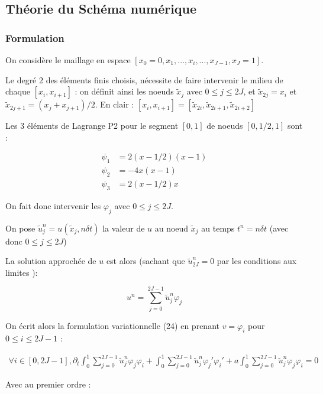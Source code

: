 \documentclass[french]{article}
\begin{document}
\subsection{Théorie du Schéma numérique}

\subsubsection{Formulation}

On considère le maillage en espace $ [x_{0}=0, x_{1},...,x_{i},...,x_{J-1},x_{J}=1] $.

Le degré 2 des éléments finis choisis, nécessite de faire intervenir le milieu de chaque $ [x_{i},x_{i+1}] $ : on définit ainsi les noeuds $ \tilde{x}_{j} $ avec $ 0 \leq j \leq 2J $, et $ \tilde{x}_{2j} = x_{i} $ et $ \tilde{x}_{2j+1} = (x_{j}+x_{j+1}) / 2 $. En clair : $ [x_{i},x_{i+1}] = [\tilde{x}_{2i}, \tilde{x}_{2i+1}, \tilde{x}_{2i+2}]$

Les 3 éléments de Lagrange P2 pour le segment $ [0,1] $ de noeuds $ [0, 1/2, 1] $ sont :

\begin{align}
\psi_{1} &= 2(x-1/2)(x-1) \\
\psi_{2} &= -4x(x-1) \\
\psi_{3} &= 2(x-1/2)x
\end{align}

On fait donc intervenir les $ \varphi_{j} $ avec $ 0 \leq j \leq 2J $.

On pose $ \tilde{u}_{j}^{n} = u(\tilde{x}_{j},n\delta t) $ la valeur de $ u $ au noeud $ \tilde{x}_{j} $ au temps $ t^{n} = n \delta t $ (avec donc $ 0 \leq j \leq 2J $)

La solution approchée de $ u $ est alors (sachant que $ \tilde{u}^{n}_{2J} = 0 $ par les conditions aux limites ):

\[
u^{n}=\sum_{j=0}^{2J-1}\tilde{u}^{n}_{j}\varphi_{j}
\]

On écrit alors la formulation variationnelle (24) en prenant $ v = \varphi_{i} $ pour $ 0 \leq i \leq 2J-1 $ :

\begin{align}
\forall i \in [0,2J-1], 
\partial_{t}\int_{0}^{1}\sum_{j=0}^{2J-1}\tilde{u}_{j}^{n}\varphi_{j}\varphi_{i}
+ \int_{0}^{1}\sum_{j=0}^{2J-1}\tilde{u}_{j}^{n}\varphi_{j}'\varphi_{i}'
+ a \int_{0}^{1}\sum_{j=0}^{2J-1}\tilde{u}_{j}^{n}\varphi_{j}\varphi_{i} =0
\end{align}

Avec au premier ordre : 
\end{document}
